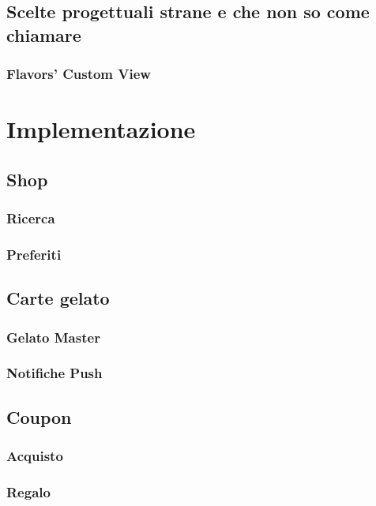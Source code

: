 \documentclass{article}
\begin{document}
\subsection{Scelte progettuali strane e che non so come chiamare}

\subsubsection{Flavors’ Custom View}

  \newpage
\section{Implementazione}

\subsection{Shop}

\subsubsection{Ricerca}

\subsubsection{Preferiti}

\subsection{Carte gelato}

\subsubsection{Gelato Master}

\subsubsection{Notifiche Push}

\subsection{Coupon}

\subsubsection{Acquisto}

\subsubsection{Regalo}
\end{document}
